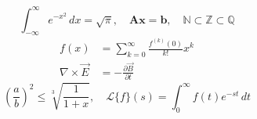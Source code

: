 \documentclass{article}
\begin{document}
\[ \int_{-\infty}^{\infty} e^{-x^2}\,dx=\sqrt{\pi},\quad \symbf{A}\symbf{x}=\symbf{b},
   \quad \mathbb{N}\subset\mathbb{Z}\subset\mathbb{Q} \]
\begin{align}
  f(x) &= \sum_{k=0}^{\infty}\frac{f^{(k)}(0)}{k!}x^k \\
  \nabla\times\vec{E} &= -\frac{\partial\vec{B}}{\partial t}
\end{align}
\[ \left( \frac{a}{b} \right)^{\!2} \leq \sqrt[3]{\frac{1}{1+x}},\quad
   \mathcal{L}\{f\}(s)=\int_0^\infty f(t)e^{-st}\,dt \]
\end{document}
